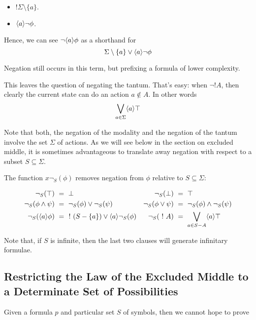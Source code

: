\begin{itemize}

\item $!\Sigma \setminus \{a\}$.

\item $\langle a \rangle \neg \phi$.

\end{itemize}

\NI Hence, we can see $\neg \langle a \rangle \phi$ as a shorthand for 
\[
   \Sigma \setminus \{a\} \lor \langle a \rangle \neg \phi
\]

\NI Negation still occurs in this term, but prefixing a formula of
lower complexity.

This leaves the question of negating the tantum. That's easy: when
$\neg !A$, then clearly the current state can do an action $a \notin
A$. In other words
\[
   \bigvee_{a \in \Sigma}\langle a \rangle \top
\]

\NI Note that both, the negation of the modality and the negation of
the tantum involve the set $\Sigma$ of actions. As we will see below in the section
on excluded middle, it is sometimes advantageous to translate away negation with respect to 
a subset $S \subseteq \Sigma$. 

\begin{definition}
The function $x \neg_{S}(\phi)$ removes negation from $\phi$
relative to $S \subseteq \Sigma$:

\begin{align*}
  \neg_{S}(\top) &\ =\  \bot  &
  \neg_S(\bot) &\ =\  \top  \\
  \neg_S(\phi \land \psi) &\ =\  \neg_S(\phi) \lor \neg_S(\psi)  &
  \neg_S(\phi \lor \psi) &\ =\  \neg_S(\phi) \land \neg_S(\psi)  \\
  \neg_S(\langle a \rangle \phi) &\ =\  \ ! \ (S-\{a\}) \lor \langle a \rangle \neg_S(\phi)  &
  \neg_S(\ ! \  A) &\ =\  \bigvee_{a \in S - A} \langle a \rangle \top
\end{align*}


\end{definition}

\NI Note that, if $S$ is infinite, then the last two clauses will generate infinitary formulae.

\subsection{Restricting the Law of the Excluded Middle to a Determinate Set of Possibilities}

Given a formula $p$ and particular set $S$ of symbols, then we
cannot hope to prove


